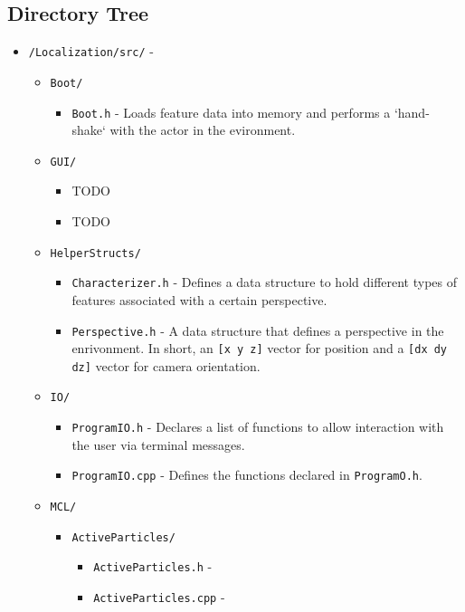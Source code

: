\documentclass[a4paper,11pt]{article}
\begin{document}
  \subsection{Directory Tree}
  \begin{itemize}
    \item \texttt{/Localization/src/} -
    \begin{itemize}
      \item \texttt{Boot/}
        \begin{itemize}
	  \item \texttt{Boot.h} - Loads feature data into memory and performs a `hand-shake` with the actor in the evironment.
        \end{itemize}
      \item \texttt{GUI/}
        \begin{itemize}
          \item TODO
          \item TODO
        \end{itemize}
      \item \texttt{HelperStructs/}
        \begin{itemize}
          \item \texttt{Characterizer.h} - Defines a data structure to hold different types of features associated with a certain perspective.
          \item \texttt{Perspective.h} - A data structure that defines a perspective in the enrivonment. In short, an \texttt{[x y z]} vector for position and a
          \texttt{[dx dy dz]} vector for camera orientation.
         \end{itemize}
      \item \texttt{IO/}
        \begin{itemize}
          \item \texttt{ProgramIO.h} - Declares a list of functions to allow interaction with the user via terminal messages. 
          \item \texttt{ProgramIO.cpp} - Defines the functions declared in \texttt{ProgramO.h}. 
        \end{itemize}
      \item \texttt{MCL/}
        \begin{itemize}
          \item \texttt{ActiveParticles/}
            \begin{itemize}
              \item \texttt{ActiveParticles.h} -
              \item \texttt{ActiveParticles.cpp} -

\end{itemize}
\end{itemize}
\end{itemize}
\end{itemize}
\end{document}

